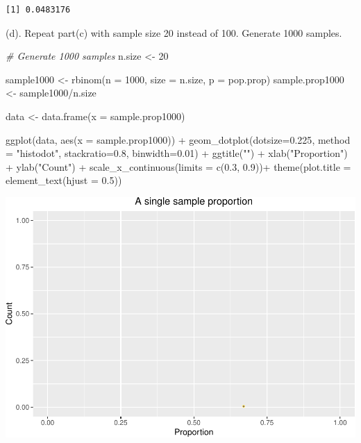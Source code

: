 \documentclass[
]{book}
\newenvironment{Shaded}{\begin{snugshade}}{\end{snugshade}}
\newcommand{\AttributeTok}[1]{\textcolor[rgb]{0.77,0.63,0.00}{#1}}
\newcommand{\CommentTok}[1]{\textcolor[rgb]{0.56,0.35,0.01}{\textit{#1}}}
\newcommand{\DecValTok}[1]{\textcolor[rgb]{0.00,0.00,0.81}{#1}}
\newcommand{\FloatTok}[1]{\textcolor[rgb]{0.00,0.00,0.81}{#1}}
\newcommand{\FunctionTok}[1]{\textcolor[rgb]{0.00,0.00,0.00}{#1}}
\newcommand{\NormalTok}[1]{#1}
\newcommand{\OtherTok}[1]{\textcolor[rgb]{0.56,0.35,0.01}{#1}}
\newcommand{\SpecialCharTok}[1]{\textcolor[rgb]{0.00,0.00,0.00}{#1}}
\newcommand{\StringTok}[1]{\textcolor[rgb]{0.31,0.60,0.02}{#1}}
\begin{document}
\begin{verbatim}
[1] 0.0483176
\end{verbatim}

(d). Repeat part(c) with sample size 20 instead of 100. Generate 1000 samples.

\begin{Shaded}
\begin{Highlighting}[]
\CommentTok{\# Generate 1000 samples}
\NormalTok{n.size }\OtherTok{\textless{}{-}} \DecValTok{20}

\NormalTok{sample1000 }\OtherTok{\textless{}{-}} \FunctionTok{rbinom}\NormalTok{(}\AttributeTok{n =} \DecValTok{1000}\NormalTok{, }\AttributeTok{size =}\NormalTok{ n.size, }\AttributeTok{p =}\NormalTok{ pop.prop)  }
\NormalTok{sample.prop1000 }\OtherTok{\textless{}{-}}\NormalTok{ sample1000}\SpecialCharTok{/}\NormalTok{n.size }

\NormalTok{data }\OtherTok{\textless{}{-}} \FunctionTok{data.frame}\NormalTok{(}\AttributeTok{x =}\NormalTok{ sample.prop1000)}

\FunctionTok{ggplot}\NormalTok{(data, }\FunctionTok{aes}\NormalTok{(}\AttributeTok{x =}\NormalTok{ sample.prop1000)) }\SpecialCharTok{+}
  \FunctionTok{geom\_dotplot}\NormalTok{(}\AttributeTok{dotsize=}\FloatTok{0.225}\NormalTok{, }\AttributeTok{method =} \StringTok{"histodot"}\NormalTok{, }\AttributeTok{stackratio=}\FloatTok{0.8}\NormalTok{, }\AttributeTok{binwidth=}\FloatTok{0.01}\NormalTok{) }\SpecialCharTok{+}
  \FunctionTok{ggtitle}\NormalTok{(}\StringTok{""}\NormalTok{) }\SpecialCharTok{+}  \FunctionTok{xlab}\NormalTok{(}\StringTok{"Proportion"}\NormalTok{) }\SpecialCharTok{+} \FunctionTok{ylab}\NormalTok{(}\StringTok{"Count"}\NormalTok{) }\SpecialCharTok{+}
  \FunctionTok{scale\_x\_continuous}\NormalTok{(}\AttributeTok{limits =} \FunctionTok{c}\NormalTok{(}\FloatTok{0.3}\NormalTok{, }\FloatTok{0.9}\NormalTok{))}\SpecialCharTok{+} 
  \FunctionTok{theme}\NormalTok{(}\AttributeTok{plot.title =} \FunctionTok{element\_text}\NormalTok{(}\AttributeTok{hjust =} \FloatTok{0.5}\NormalTok{))}
\end{Highlighting}
\end{Shaded}

\includegraphics[width=1\linewidth]{Class_Activity_7_files/figure-latex/unnamed-chunk-10-1}
\end{document}
